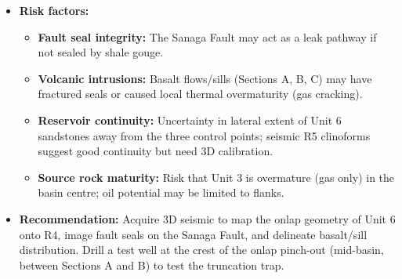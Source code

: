 \documentclass[11pt]{article}
\begin{document}
\begin{exoresolu}
\begin{itemize}
\begin{itemize}
        \item \textbf{Critical timing:} Oil generation (Late Cretaceous) \emph{pre-dates} trap formation (Oligocene–Miocene). However, gas generation (Miocene) is \emph{synchronous} with trap formation. Migration pathways: carrier beds along the Sanaga Fault and along the R4 unconformity surface.
    \end{itemize}
    \item \textbf{Risk factors:}
    \begin{itemize}
        \item \textbf{Fault seal integrity:} The Sanaga Fault may act as a leak pathway if not sealed by shale gouge.
        \item \textbf{Volcanic intrusions:} Basalt flows/sills (Sections A, B, C) may have fractured seals or caused local thermal overmaturity (gas cracking).
        \item \textbf{Reservoir continuity:} Uncertainty in lateral extent of Unit 6 sandstones away from the three control points; seismic R5 clinoforms suggest good continuity but need 3D calibration.
        \item \textbf{Source rock maturity:} Risk that Unit 3 is overmature (gas only) in the basin centre; oil potential may be limited to flanks.
    \end{itemize}
    \item \textbf{Recommendation:} Acquire 3D seismic to map the onlap geometry of Unit 6 onto R4, image fault seals on the Sanaga Fault, and delineate basalt/sill distribution. Drill a test well at the crest of the onlap pinch-out (mid-basin, between Sections A and B) to test the truncation trap.
\end{itemize}
\end{exoresolu}
\end{document}
